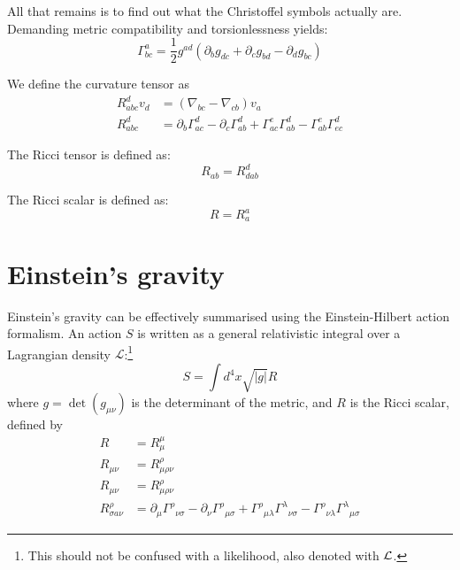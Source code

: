 All that remains is to find out what the Christoffel symbols actually are. Demanding metric compatibility and torsionlessness yields:
\begin{equation}
  \Gamma^a_{bc} = \frac{1}{2}g^{ad}
  \left( 
  \partial_b g_{dc} 
  +\partial_c g_{bd} 
  -\partial_d g_{bc} 
  \right)
  \label{eqn:cos:christoffel}
\end{equation}

We define the curvature tensor as
\begin{align}
  R^d_{abc} v_d &= \left( \nabla_{bc} - \nabla_{cb} \right) v_a
  \label{eqn:cos:riemann_def}\\
  R^d_{abc} &= \partial_b \Gamma^d_{ac} - \partial_c \Gamma^d_{ab} + \Gamma^e_{ac}\Gamma^d_{ab} - \Gamma^e_{ab}\Gamma^d_{ec}
\end{align}

The Ricci tensor is defined as:
\begin{equation}
  R_{ab} = R^d_{dab}
  \label{eqn:cos:ricci_tensor}
\end{equation}

The Ricci scalar is defined as:
\begin{equation}
  R = R^a_a
  \label{eqn:cos:ricci_scalar}
\end{equation}






\section{Einstein's gravity}
\label{sec:cos:einsteins_gravity}

Einstein's gravity can be effectively summarised using the Einstein-Hilbert action formalism. An action $S$ is written as a general relativistic integral over a Lagrangian density $\mathcal{L}$:\footnote{This should not be confused with a likelihood, also denoted with $\mathcal{L}$.}
\begin{equation}
  S = \int d^4 x \sqrt{|g|} R
  \label{eqn:cos:action}
\end{equation}
where $g=\det(g_{\mu\nu})$ is the determinant of the metric, and $R$ is the Ricci scalar, defined by
\begin{align}
  R &= R^\mu_\mu \label{eqn:cos:ricci_scalar_def} \\
  R_{\mu\nu} &= R^\rho_{\mu\rho\nu} \label{eqn:cos:ricci_tensor_def} \\
  R_{\mu\nu} &= R^\rho_{\mu\rho\nu} \label{eqn:cos:riemann_tensor_def} \\
  R^\rho_{\sigma a\nu} &= \partial_\mu\Gamma^\rho{}_{\nu\sigma}
    - \partial_\nu\Gamma^\rho{}_{\mu\sigma}
    + \Gamma^\rho{}_{\mu\lambda}\Gamma^\lambda{}_{\nu\sigma}
    - \Gamma^\rho{}_{\nu\lambda}\Gamma^\lambda{}_{\mu\sigma}
\end{align}

